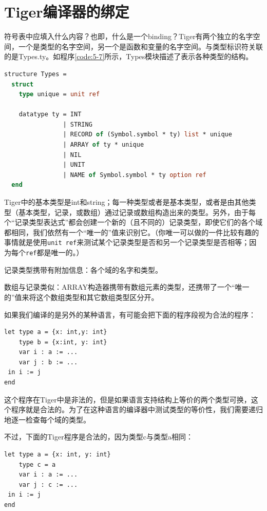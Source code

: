 \documentclass[cn,11pt,chinese]{elegantbook}
\begin{document}
\section{Tiger编译器的绑定}

符号表中应填入什么内容？也即，什么是一个binding？Tiger有两个独立的名字空间，一个是类型的名字空间，另一个是函数和变量的名字空间。与类型标识符关联的是Types.ty。如程序\ref{code:5-7}所示，Types模块描述了表示各种类型的结构。

\begin{lstlisting}[language=ml,caption={Types结构},label={code:5-7}]
  structure Types =
  struct
    type unique = unit ref

    datatype ty = INT
                | STRING
                | RECORD of (Symbol.symbol * ty) list * unique
                | ARRAY of ty * unique
                | NIL
                | UNIT
                | NAME of Symbol.symbol * ty option ref
  end
\end{lstlisting}

Tiger中的基本类型是int和string；每一种类型或者是基本类型，或者是由其他类型（基本类型，记录，或数组）通过记录或数组构造出来的类型。另外，由于每个“记录类型表达式”都会创建一个新的（且不同的）记录类型，即使它们的各个域都相同，我们依然有一个“唯一的”值来识别它。（你唯一可以做的一件比较有趣的事情就是使用\lstinline{unit ref}来测试某个记录类型是否和另一个记录类型是否相等；因为每个\lstinline{ref}都是唯一的。）

记录类型携带有附加信息：各个域的名字和类型。

数组与记录类似：ARRAY构造器携带有数组元素的类型，还携带了一个“唯一的”值来将这个数组类型和其它数组类型区分开。

如果我们编译的是另外的某种语言，有可能会把下面的程序段视为合法的程序：

\begin{lstlisting}
let type a = {x: int,y: int}
    type b = {x:int, y: int}
    var i : a := ...
    var j : b := ...
 in i := j
end
\end{lstlisting}
 
这个程序在Tiger中是非法的，但是如果语言支持结构上等价的两个类型可换，这个程序就是合法的。为了在这种语言的编译器中测试类型的等价性，我们需要递归地逐一检查每个域的类型。

不过，下面的Tiger程序是合法的，因为类型c与类型a相同：

\begin{lstlisting}
let type a = {x: int, y: int}
    type c = a
    var i : a := ...
    var j : c := ...
 in i := j
end
\end{lstlisting}
\end{document}
